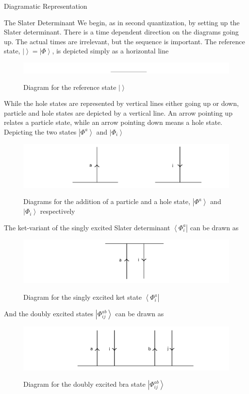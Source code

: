 \documentclass[twoside,english]{uiofysmaster}
\begin{document}
\begin{chapter}{Diagramatic Representation}
	\begin{section}{The Slater Determinant}
		We begin, as in second quantization, by setting up the Slater determinant. There is a time dependent direction on the diagrams going up. The actual times are irrelevant, but the sequence is important. The reference state, $| \left. \right> = \left| \Phi \right>$, is depicted simply as a horizontal line
		\begin{figure}[H]
			\includegraphics[width=\textwidth]{Figures/SlaterDeterminant1.pdf}
			\label{SlaterDeterminant1}
			\caption{Diagram for the reference state $| \left. \right>$}
		\end{figure}
		While the hole states are represented by vertical lines either going up or down, particle and hole states are depicted by a vertical line. An arrow pointing up relates a particle state, while an arrow pointing down means a hole state. Depicting the two states $\left| \Phi^a \right> $ and $\left| \Phi_i \right>$
		\begin{figure}[H]
			\includegraphics[width=\textwidth]{Figures/SlaterDeterminant2.pdf}
			\label{SlaterDeterminant2}
			\caption{Diagrams for the addition of a particle and a hole state, $\left| \Phi^a \right> $ and $\left| \Phi_i \right> $ respectively}
		\end{figure}
		The ket-variant of the singly excited Slater determinant $\left< \Phi_i^a \right| $ can be drawn as
		\begin{figure}[H]
			\includegraphics[width=\textwidth]{Figures/SlaterDeterminant3.pdf}
			\label{SlaterDeterminant3}
			\caption{Diagram for the singly excited ket state $\left< \Phi_i^a \right|$}
		\end{figure}
		And the doubly excited states $\left| \Phi_{ij}^{ab} \right>$ can be drawn as
		\begin{figure}[H]
			\includegraphics[width=\textwidth]{Figures/SlaterDeterminant4.pdf}
			\label{SlaterDeterminant4}
			\caption{Diagram for the doubly excited bra state $\left| \Phi_{ij}^{ab} \right>$}
		\end{figure}
	\end{section}


\end{chapter}
\end{document}
